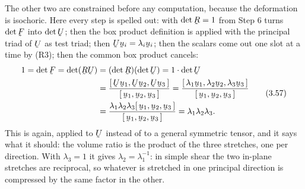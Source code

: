 The other two are constrained before any computation, because the
deformation is isochoric. Here every step is spelled out:  with
$\det\bR=1$ from Step 6 turns $\det\bF$ into $\det\bU$; then the box
product definition is applied with the principal triad of $\bU$ as test
triad; then $\bU\bu_{i}=\lambda_{i}\bu_{i}$; then the scalars come out one
slot at a time by (R3); then the common box product cancels:
\begin{equation}
\begin{aligned}
   1=\det\bF=\det(\bR\bU)&=(\det\bR)(\det\bU)=1\cdot\det\bU\\
   &=\frac{\tbox{\bU\bu_{1}}{\bU\bu_{2}}{\bU\bu_{3}}}
          {\tbox{\bu_{1}}{\bu_{2}}{\bu_{3}}}
    =\frac{\tbox{\lambda_{1}\bu_{1}}{\lambda_{2}\bu_{2}}
                {\lambda_{3}\bu_{3}}}{\tbox{\bu_{1}}{\bu_{2}}{\bu_{3}}}\\
   &=\frac{\lambda_{1}\lambda_{2}\lambda_{3}
           \tbox{\bu_{1}}{\bu_{2}}{\bu_{3}}}
          {\tbox{\bu_{1}}{\bu_{2}}{\bu_{3}}}
    =\lambda_{1}\lambda_{2}\lambda_{3}.
\end{aligned}
   \tag{3.57}\label{eq:3.57}
\end{equation}
This is  again, applied to $\bU$ instead of to a general symmetric
tensor, and it says what it should: the volume ratio is the product of the
three stretches, one per direction. With $\lambda_{3}=1$ it gives
$\lambda_{2}=\lambda_{1}^{-1}$: in simple shear the two in-plane stretches
are reciprocal, so whatever is stretched in one principal direction is
compressed by the same factor in the other.

